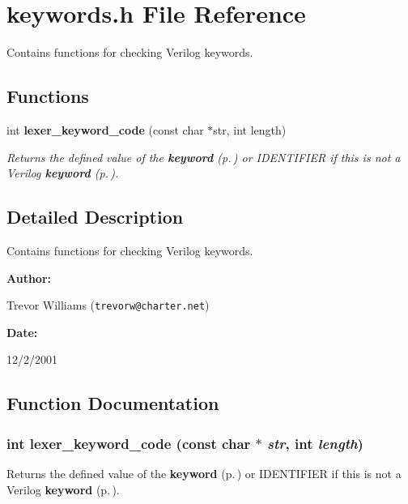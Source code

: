 \section{keywords.h File Reference}
\label{keywords_8h}
Contains functions for checking Verilog keywords. 


\subsection*{Functions}
\begin{CompactItemize}
\item 
int {\bf lexer\_\-keyword\_\-code} (const char $\ast$str, int length)
\begin{CompactList}\small\item\em Returns the defined value of the {\bf keyword} {\rm (p.\,\pageref{structkeyword})} or IDENTIFIER if this is not a Verilog {\bf keyword} {\rm (p.\,\pageref{structkeyword})}.\item\end{CompactList}\end{CompactItemize}


\subsection{Detailed Description}
Contains functions for checking Verilog keywords.



\begin{Desc}
\item[{\bf Author: }]\par
Trevor Williams ({\tt trevorw@charter.net}) \end{Desc}
\begin{Desc}
\item[{\bf Date: }]\par
12/2/2001

\end{Desc}


\subsection{Function Documentation}
\subsubsection{\setlength{\rightskip}{0pt plus 5cm}int lexer\_\-keyword\_\-code (const char $\ast$ {\em str}, int {\em length})}\label{keywords_8h_a0}


Returns the defined value of the {\bf keyword} {\rm (p.\,\pageref{structkeyword})} or IDENTIFIER if this is not a Verilog {\bf keyword} {\rm (p.\,\pageref{structkeyword})}.

